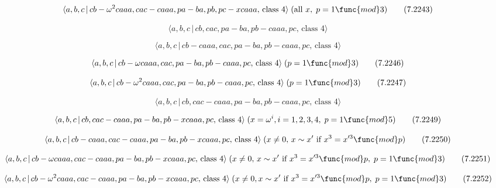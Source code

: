 \documentclass[10pt]{article}
\begin{document}
\begin{equation}
\langle a,b,c\,|\,cb-\omega ^{2}caaa,cac-caaa,pa-ba,pb,pc-xcaaa,\,\text{%
class }4\rangle \;(\text{all }x,\;p=1\func{mod}3)  \tag{7.2243}
\end{equation}

\begin{equation}
\langle a,b,c\,|\,cb,cac,pa-ba,pb-caaa,pc,\,\text{class }4\rangle 
\tag{7.2244}
\end{equation}

\begin{equation}
\langle a,b,c\,|\,cb-caaa,cac,pa-ba,pb-caaa,pc,\,\text{class }4\rangle 
\tag{7.2245}
\end{equation}

\begin{equation}
\langle a,b,c\,|\,cb-\omega caaa,cac,pa-ba,pb-caaa,pc,\,\text{class }%
4\rangle \;(p=1\func{mod}3)  \tag{7.2246}
\end{equation}

\begin{equation}
\langle a,b,c\,|\,cb-\omega ^{2}caaa,cac,pa-ba,pb-caaa,pc,\,\text{class }%
4\rangle \;(p=1\func{mod}3)  \tag{7.2247}
\end{equation}

\begin{equation}
\langle a,b,c\,|\,cb,cac-caaa,pa-ba,pb-caaa,pc,\,\text{class }4\rangle 
\tag{7.2248}
\end{equation}

\begin{equation}
\langle a,b,c\,|\,cb,cac-caaa,pa-ba,pb-xcaaa,pc,\,\text{class }4\rangle
\;(x=\omega ^{i},i=1,2,3,4,\;p=1\func{mod}5)  \tag{7.2249}
\end{equation}

\begin{equation}
\langle a,b,c\,|\,cb-caaa,cac-caaa,pa-ba,pb-xcaaa,pc,\,\text{class }4\rangle
\;(x\neq 0,\,x\sim x^{\prime }\text{ if }x^{3}=x^{\prime 3}\func{mod}p) 
\tag{7.2250}
\end{equation}

\begin{equation}
\langle a,b,c\,|\,cb-\omega caaa,cac-caaa,pa-ba,pb-xcaaa,pc,\,\text{class }%
4\rangle \;(x\neq 0,\,x\sim x^{\prime }\text{ if }x^{3}=x^{\prime 3}\func{mod%
}p,\;p=1\func{mod}3)  \tag{7.2251}
\end{equation}

\begin{equation}
\langle a,b,c\,|\,cb-\omega ^{2}caaa,cac-caaa,pa-ba,pb-xcaaa,pc,\,\text{%
class }4\rangle \;(x\neq 0,x \sim x^{\prime }\text{ if }x^3=x^{\prime 3}%
\func{mod}p,\;p=1\func{mod}3)  \tag{7.2252}
\end{equation}
\end{document}
